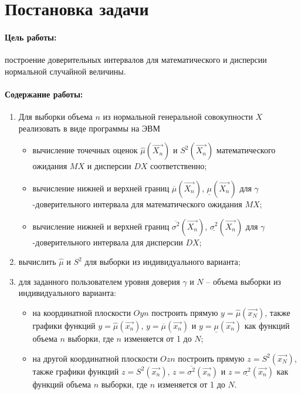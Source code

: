 \documentclass[a4paper, 12pt]{article}
\theoremstyle{definition}
\begin{document}
\section{Постановка задачи}

\paragraph{Цель работы:} построение доверительных интервалов для математического и дисперсии нормальной случайной величины.

\paragraph{Содержание работы:}

\begin{enumerate}
    \item Для выборки объема $n$ из нормальной генеральной совокупности $X$ реализовать в виде программы на ЭВМ
    \begin{itemize}
        \item вычисление точечных оценок $\hat{\mu}(\vec{X_n})$ и $S^2(\vec{X_n})$ математического ожидания $MX$ и дисперсии $DX$ соответственно;
        \item вычисление нижней и верхней границ $\overline{\mu}(\vec{X_n})$, $\underline{\mu}(\vec{X_n})$ для $\gamma$-доверительного интервала для математического ожидания $MX$;
        \item вычисление нижней и верхней границ $\overline{\sigma^2}(\vec{X_n})$, $\underline{\sigma^2}(\vec{X_n})$ для $\gamma$-доверительного интервала для дисперсии $DX$;
    \end{itemize}
    \item вычислить $\hat{\mu}$ и $S^2$ для выборки из индивидуального варианта;
    \item для заданного пользователем уровня доверия $\gamma$ и $N$ – объема выборки из индивидуального варианта:
    \begin{itemize}
        \item на координатной плоскости $Oyn$ построить прямую $y = \hat{\mu}(\vec{x_N})$, также графики функций $y = \hat{\mu}(\vec{x_n})$, $y = \overline{\mu}(\vec{x_n})$ и $y = \underline{\mu}(\vec{x_n})$ как функций объема $n$ выборки, где $n$ изменяется от 1 до $N$;
        \item на другой координатной плоскости $Ozn$ построить прямую $z = S^2(\vec{x_N})$, также графики функций $z = S^2(\vec{x_n})$, $z = \overline{\sigma^2}(\vec{x_n})$ и $z = \underline{\sigma^2}(\vec{x_n})$ как функций объема $n$ выборки, где $n$ изменяется от 1 до $N$.
    \end{itemize}
\end{enumerate}
\end{document}
